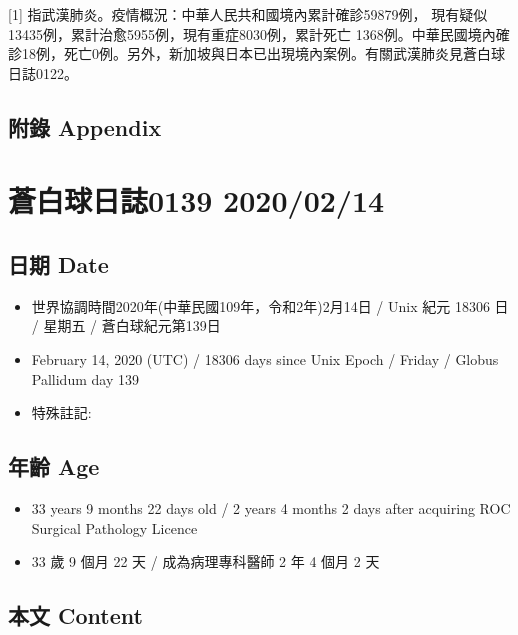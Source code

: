 \documentclass[
]{article}
\providecommand{\tightlist}{%
  \setlength{\itemsep}{0pt}\setlength{\parskip}{0pt}}
\begin{document}
{[}1{]} 指武漢肺炎。疫情概況：中華人民共和國境內累計確診59879例，
現有疑似 13435例，累計治愈5955例，現有重症8030例，累計死亡
1368例。中華民國境內確診18例，死亡0例。另外，新加坡與日本已出現境內案例。有關武漢肺炎見蒼白球日誌0122。

\hypertarget{ux9644ux9304-appendix-74}{%
\subsection{附錄 Appendix}\label{ux9644ux9304-appendix-74}}

\hypertarget{ux84bcux767dux7403ux65e5ux8a8c0139-20200214}{%
\section{蒼白球日誌0139
2020/02/14}\label{ux84bcux767dux7403ux65e5ux8a8c0139-20200214}}

\hypertarget{ux65e5ux671f-date-75}{%
\subsection{日期 Date}\label{ux65e5ux671f-date-75}}

\begin{itemize}
\tightlist
\item
  世界協調時間2020年(中華民國109年，令和2年)2月14日 / Unix 紀元 18306 日
  / 星期五 / 蒼白球紀元第139日
\item
  February 14, 2020 (UTC) / 18306 days since Unix Epoch / Friday /
  Globus Pallidum day 139
\item
  特殊註記:
\end{itemize}

\hypertarget{ux5e74ux9f61-age-75}{%
\subsection{年齡 Age}\label{ux5e74ux9f61-age-75}}

\begin{itemize}
\tightlist
\item
  33 years 9 months 22 days old / 2 years 4 months 2 days after
  acquiring ROC Surgical Pathology Licence
\item
  33 歲 9 個月 22 天 / 成為病理專科醫師 2 年 4 個月 2 天
\end{itemize}

\hypertarget{ux672cux6587-content-75}{%
\subsection{本文 Content}\label{ux672cux6587-content-75}}
\end{document}
